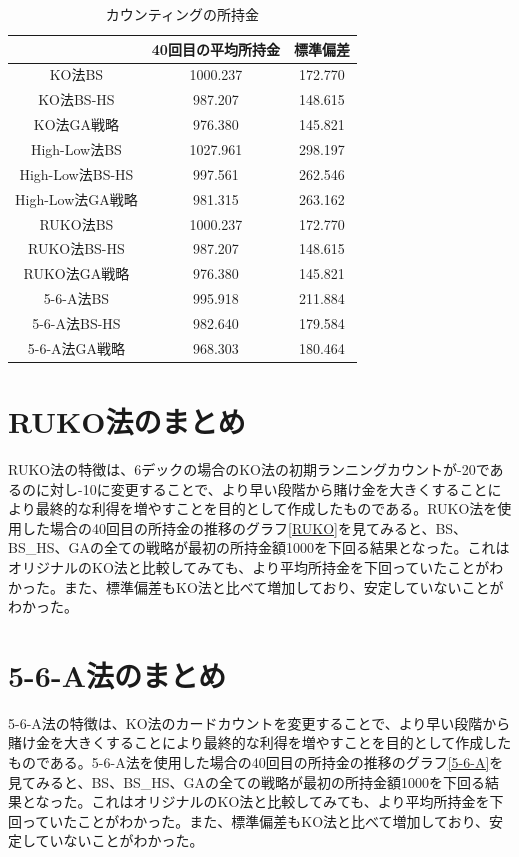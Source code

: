 \begin{table}[H]
 \caption{カウンティングの所持金\label{countting}}
 \begin{center}
  \begin{tabular}{|c|c|c|}
  \hline  & 40回目の平均所持金 & 標準偏差 \\
  \hline KO法BS & 1000.237 & 172.770\\
  \hline KO法BS-HS & 987.207 & 148.615 \\
  \hline KO法GA戦略 & 976.380 & 145.821\\
  \hline High-Low法BS & 1027.961 & 298.197\\
  \hline High-Low法BS-HS  & 997.561 & 262.546\\
  \hline High-Low法GA戦略 & 981.315 & 263.162\\
  \hline RUKO法BS & 1000.237 & 172.770\\
  \hline RUKO法BS-HS & 987.207 & 148.615 \\
  \hline RUKO法GA戦略 & 976.380 & 145.821\\
  \hline 5-6-A法BS & 995.918 & 211.884\\
  \hline 5-6-A法BS-HS & 982.640 & 179.584 \\
  \hline 5-6-A法GA戦略 & 968.303 & 180.464\\
  \hline
  \end{tabular}
 \end{center}
\end{table}

\section{RUKO法のまとめ}
RUKO法の特徴は、6デックの場合のKO法の初期ランニングカウントが-20であるのに対し-10に変更することで、より早い段階から賭け金を大きくすることにより最終的な利得を増やすことを目的として作成したものである。RUKO法を使用した場合の40回目の所持金の推移のグラフ\ref{RUKO}を見てみると、BS、BS\_HS、GAの全ての戦略が最初の所持金額1000を下回る結果となった。これはオリジナルのKO法と比較してみても、より平均所持金を下回っていたことがわかった。また、標準偏差もKO法と比べて増加しており、安定していないことがわかった。
\section{5-6-A法のまとめ}
5-6-A法の特徴は、KO法のカードカウントを変更することで、より早い段階から賭け金を大きくすることにより最終的な利得を増やすことを目的として作成したものである。5-6-A法を使用した場合の40回目の所持金の推移のグラフ\ref{5-6-A}を見てみると、BS、BS\_HS、GAの全ての戦略が最初の所持金額1000を下回る結果となった。これはオリジナルのKO法と比較してみても、より平均所持金を下回っていたことがわかった。また、標準偏差もKO法と比べて増加しており、安定していないことがわかった。
